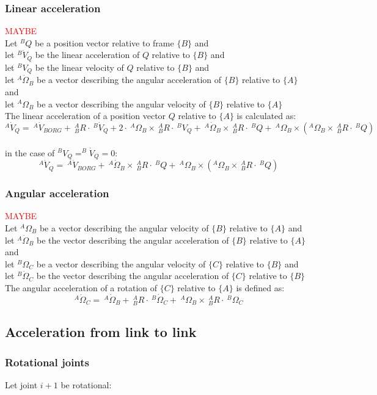 \documentclass[10pt,a4paper]{article}
\newcommand{\maybe}{\textcolor{red}{MAYBE \\}}
\begin{document}
\subsubsection{Linear acceleration} \maybe
Let $^BQ$ be a position vector relative to frame $\{B\}$ and \\
let $^B\dot V_Q$ be the linear acceleration of $Q$ relative to $\{B\}$ and \\
let $^B V_Q$ be the linear velocity of $Q$ relative to $\{B\}$ and \\
let $^A\dot \Omega_B$ be a vector describing the angular acceleration of $\{B\}$ relative to $\{A\}$ and \\
let $^A\Omega_B$ be a vector describing the angular velocity of $\{B\}$ relative to $\{A\}$ \\
The linear acceleration of a position vector $Q$ relative to $\{A\}$ is calculated as:
$$
^A\dot V_Q = ~^A\dot{V}_{BORG} + ~^A_BR ⋅ ~^B\dot V_Q + 2 ⋅ ~^A\Omega_B \times ~^A_BR ⋅ ~^BV_Q + ~^A\dot \Omega_B \times ~^A_BR ⋅ ~^BQ + ~^A\Omega_B \times (^A\Omega_B \times ~^A_BR ⋅ ~^BQ)
$$
\\
in the case of $^BV_Q = ^B\dot{V}_Q = 0$:
$$
^A\dot V_Q = ~^A\dot{V}_{BORG} + ~^A\dot \Omega_B \times ~^A_BR ⋅ ~^BQ + ~^A\Omega_B \times (^A\Omega_B \times ~^A_BR ⋅ ~^BQ)
$$

\subsubsection{Angular acceleration} \maybe
Let $^A\Omega_B$ be a vector describing the angular velocity of $\{B\}$ relative to $\{A\}$ and \\
let $^A\dot \Omega_B$ be the vector describing the angular acceleration of $\{B\}$ relative to $\{A\}$ and \\
let $^B\Omega_C$ be a vector describing the angular velocity of $\{C\}$ relative to $\{B\}$ and \\
let $^B\dot \Omega_C$ be the vector describing the angular acceleration of $\{C\}$ relative to $\{B\}$ \\
The angular acceleration of a rotation of $\{C\}$ relative to $\{A\}$ is defined as:
$$
^A\dot \Omega_C = ~^A\dot \Omega_B + ~^A_BR ⋅ ~^B \dot \Omega_C + ~^A\Omega_B \times ~^A_BR ⋅ ~^B\Omega_C
$$

\subsection{Acceleration from link to link}
\subsubsection{Rotational joints}
Let joint $i+1$ be rotational: \\
\end{document}
